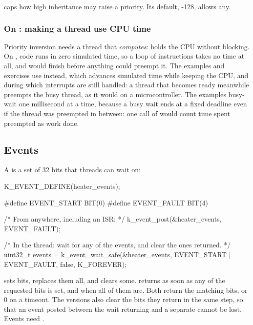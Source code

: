  caps how high inheritance may raise a priority. Its default, -128,
allows any.

\subsubsection{On : making a thread use CPU time}
Priority inversion needs a thread that \emph{computes}: holds the CPU without blocking. On
, code runs in zero simulated time, so a loop of instructions takes no time at all,
and  would finish before anything could preempt it. The examples and exercises use
\textbf{} instead, which advances simulated time while keeping the CPU, and
during which interrupts are still handled: a thread that becomes ready meanwhile preempts the busy
thread, as it would on a microcontroller. The examples busy-wait one millisecond at a time, because
a busy wait ends at a fixed deadline even if the thread was preempted in between: one call of
 would count time spent preempted as work done.

\subsection{Events}
A  is a set of 32 bits that threads can wait on:

\begin{ccode}
K_EVENT_DEFINE(heater_events);

#define EVENT_START BIT(0)
#define EVENT_FAULT BIT(4)

/* From anywhere, including an ISR: */
k_event_post(&heater_events, EVENT_FAULT);

/* In the thread: wait for any of the events, and clear the ones returned. */
uint32_t events = k_event_wait_safe(&heater_events, EVENT_START | EVENT_FAULT,
				   false, K_FOREVER);
\end{ccode}

\noindent {} sets bits,  replaces them all, and
 clears some.  returns as soon as any of the requested
bits is set, and  when all of them are. Both return the matching bits, or 0
on a timeout. The  versions also clear the bits they return in the same step, so that an
event posted between the wait returning and a separate  cannot be lost. Events
need .

